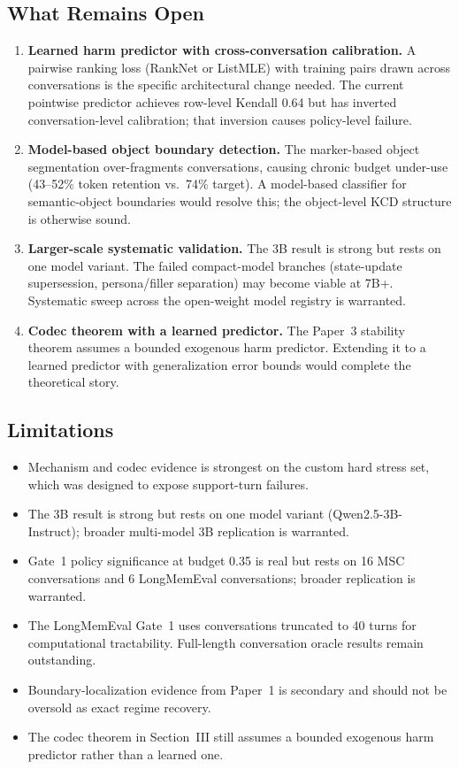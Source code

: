 \documentclass[conference]{IEEEtran}
\begin{document}
\subsection{What Remains Open}
\begin{enumerate}[leftmargin=1.4em]
    \item \textbf{Learned harm predictor with cross-conversation calibration.} A pairwise ranking loss (RankNet or ListMLE) with training pairs drawn across conversations is the specific architectural change needed. The current pointwise predictor achieves row-level Kendall 0.64 but has inverted conversation-level calibration; that inversion causes policy-level failure.
    \item \textbf{Model-based object boundary detection.} The marker-based object segmentation over-fragments conversations, causing chronic budget under-use (43--52\% token retention vs.\ 74\% target). A model-based classifier for semantic-object boundaries would resolve this; the object-level KCD structure is otherwise sound.
    \item \textbf{Larger-scale systematic validation.} The 3B result is strong but rests on one model variant. The failed compact-model branches (state-update supersession, persona/filler separation) may become viable at 7B+. Systematic sweep across the open-weight model registry is warranted.
    \item \textbf{Codec theorem with a learned predictor.} The Paper~3 stability theorem assumes a bounded exogenous harm predictor. Extending it to a learned predictor with generalization error bounds would complete the theoretical story.
\end{enumerate}

\subsection{Limitations}
\begin{itemize}[leftmargin=1.4em]
    \item Mechanism and codec evidence is strongest on the custom hard stress set, which was designed to expose support-turn failures.
    \item The 3B result is strong but rests on one model variant (Qwen2.5-3B-Instruct); broader multi-model 3B replication is warranted.
    \item Gate~1 policy significance at budget 0.35 is real but rests on 16 MSC conversations and 6 LongMemEval conversations; broader replication is warranted.
    \item The LongMemEval Gate~1 uses conversations truncated to 40 turns for computational tractability. Full-length conversation oracle results remain outstanding.
    \item Boundary-localization evidence from Paper~1 is secondary and should not be oversold as exact regime recovery.
    \item The codec theorem in Section~III still assumes a bounded exogenous harm predictor rather than a learned one.
\end{itemize}
\end{document}
